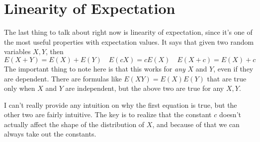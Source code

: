 \documentclass[10pt]{article}
\begin{document}
\section{Linearity of Expectation}
The last thing to talk about right now is linearity of expectation, since it's one of the most useful 
properties with expectation values. It says that given two random variables \( X, Y \), then 
\[
E(X + Y) = E(X) + E(Y) \quad E(cX) = c E(X) \quad E(X + c) = E(X) + c
\] 
The important thing to note here is that this works for \textit{any} \( X \) and \( Y \), even if they are dependent. 
There are formulas like \( E(XY) = E(X) E(Y) \) that are true only when \( X \) and \( Y \) are independent, but 
the above two are true for any \( X, Y \). 

I can't really provide any intuition on why the first equation is true, but the other two are fairly intuitive. The key
is to realize that the constant \( c \) doesn't actually affect the shape of the distribution of \( X \), and 
because of that we can always take out the constants. 
 
\end{document}
